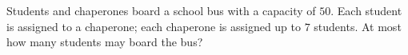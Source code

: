 Students and chaperones board a school bus with a capacity of $50$. Each student is assigned to a chaperone; each chaperone is assigned up to $7$ students. At most how many students may board the bus?
